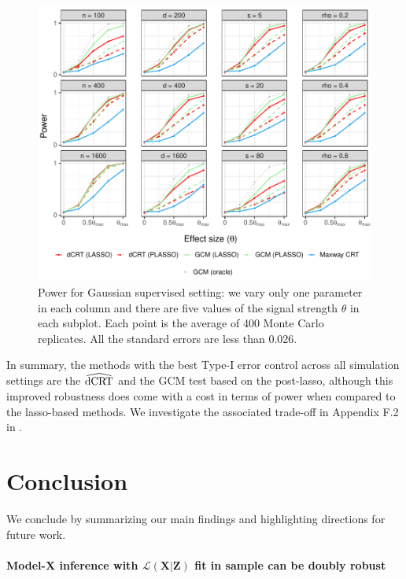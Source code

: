 \documentclass[aos]{imsart}
\theoremstyle{plain}
\theoremstyle{remark}
\newcommand{\prx}{\bm X}								%
\newcommand{\prz}{\bm Z}								%
\newcommand{\law}{\mathcal L}							%
\newcommand{\dCRThat}{\widehat{\textnormal{dCRT}}}		%
\begin{document}
\begin{figure}[h]
    \centering
    \includegraphics[width = \textwidth]{figures/gaussian_supervised_setting_alternative_partial.pdf}
    \caption{Power for Gaussian supervised setting: we vary only one parameter in each column and there are five values of the signal strength $\theta$ in each subplot. Each point is the average of 400 Monte Carlo replicates. All the standard errors are less than 0.026.}
    \label{fig:gaussian_supervised_partial_alternative}
\end{figure}

In summary, the methods with the best Type-I error control across all simulation settings are the $\dCRThat$ and the GCM test based on the post-lasso, although this improved robustness does come with a cost in terms of power when compared to the lasso-based methods. We investigate the associated trade-off in Appendix F.2 in \cite{supplementary}.

\section{Conclusion} \label{sec:conclusion}

We conclude by summarizing our main findings and highlighting directions for future work.

\paragraph*{Model-X inference with $\law(\prx|\prz)$ fit in sample can be doubly robust}
\end{document}
